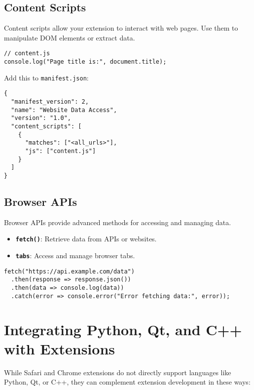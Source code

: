\documentclass[a4paper,12pt]{article}
\begin{document}
\subsection{Content Scripts}
Content scripts allow your extension to interact with web pages. Use them to manipulate DOM elements or extract data.

\begin{ExampleBox}
    \begin{verbatim}
// content.js
console.log("Page title is:", document.title);
\end{verbatim}
\end{ExampleBox}

Add this to \texttt{manifest.json}:

\begin{ExampleBox}
    \begin{verbatim}
{
  "manifest_version": 2,
  "name": "Website Data Access",
  "version": "1.0",
  "content_scripts": [
    {
      "matches": ["<all_urls>"],
      "js": ["content.js"]
    }
  ]
}
\end{verbatim}
\end{ExampleBox}

\subsection{Browser APIs}
Browser APIs provide advanced methods for accessing and managing data.
\begin{itemize}
    \item \textbf{\texttt{fetch()}}: Retrieve data from APIs or websites.
    \item \textbf{\texttt{tabs}}: Access and manage browser tabs.
\end{itemize}

\begin{ExampleBox}
    \begin{verbatim}
fetch("https://api.example.com/data")
  .then(response => response.json())
  .then(data => console.log(data))
  .catch(error => console.error("Error fetching data:", error));
\end{verbatim}
\end{ExampleBox}

\section{Integrating Python, Qt, and C++ with Extensions}
While Safari and Chrome extensions do not directly support languages like Python, Qt, or C++, they can complement extension development in these ways:
\end{document}

